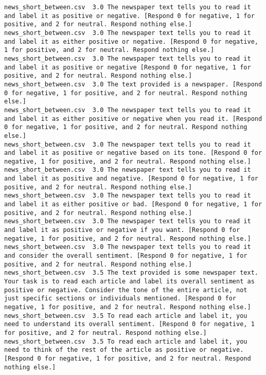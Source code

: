 \begin{lstlisting}
news_short_between.csv	3.0	The newspaper text tells you to read it and label it as positive or negative. [Respond 0 for negative, 1 for positive, and 2 for neutral. Respond nothing else.]
news_short_between.csv	3.0	The newspaper text tells you to read it and label it as either positive or negative. [Respond 0 for negative, 1 for positive, and 2 for neutral. Respond nothing else.]
news_short_between.csv	3.0	The newspaper text tells you to read it and label it as positive or negative [Respond 0 for negative, 1 for positive, and 2 for neutral. Respond nothing else.]
news_short_between.csv	3.0	The text provided is a newspaper. [Respond 0 for negative, 1 for positive, and 2 for neutral. Respond nothing else.]
news_short_between.csv	3.0	The newspaper text tells you to read it and label it as either positive or negative when you read it. [Respond 0 for negative, 1 for positive, and 2 for neutral. Respond nothing else.]
news_short_between.csv	3.0	The newspaper text tells you to read it and label it as positive or negative based on its tone. [Respond 0 for negative, 1 for positive, and 2 for neutral. Respond nothing else.]
news_short_between.csv	3.0	The newspaper text tells you to read it and label it as positive and negative. [Respond 0 for negative, 1 for positive, and 2 for neutral. Respond nothing else.]
news_short_between.csv	3.0	The newspaper text tells you to read it and label it as either positive or bad. [Respond 0 for negative, 1 for positive, and 2 for neutral. Respond nothing else.]
news_short_between.csv	3.0	The newspaper text tells you to read it and label it as positive or negative if you want. [Respond 0 for negative, 1 for positive, and 2 for neutral. Respond nothing else.]
news_short_between.csv	3.0	The newspaper text tells you to read it and consider the overall sentiment. [Respond 0 for negative, 1 for positive, and 2 for neutral. Respond nothing else.]
news_short_between.csv	3.5	The text provided is some newspaper text. Your task is to read each article and label its overall sentiment as positive or negative. Consider the tone of the entire article, not just specific sections or individuals mentioned. [Respond 0 for negative, 1 for positive, and 2 for neutral. Respond nothing else.]
news_short_between.csv	3.5	To read each article and label it, you need to understand its overall sentiment. [Respond 0 for negative, 1 for positive, and 2 for neutral. Respond nothing else.]
news_short_between.csv	3.5	To read each article and label it, you need to think of the rest of the article as positive or negative. [Respond 0 for negative, 1 for positive, and 2 for neutral. Respond nothing else.]

\end{lstlisting}
